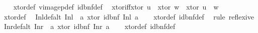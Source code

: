 \begin{isabellebody}
%
\isadelimproof
\ \ %
\endisadelimproof
%
\isatagproof
{}\isamarkupfalse%
\ xtor{\isacharunderscore}{\kern0pt}def\ vimage{}p{\isacharunderscore}{\kern0pt}def\ id{\isacharunderscore}{\kern0pt}bnf{\isacharunderscore}{\kern0pt}def\ \isacommand{{\isachardot}{\kern0pt}{\isachardot}{\kern0pt}}\isamarkupfalse%
%
\endisatagproof
{\isafoldproof}%
%
\isadelimproof
\isanewline
%
\endisadelimproof
\isanewline
{}\isamarkupfalse%
\ xtor{\isacharunderscore}{\kern0pt}iff{\isacharunderscore}{\kern0pt}xtor{\isacharcolon}{\kern0pt}\ {\isachardoublequoteopen}u\ {\isacharequal}{\kern0pt}\ xtor\ w\ {\isasymlongleftrightarrow}\ xtor\ u\ {\isacharequal}{\kern0pt}\ w{\isachardoublequoteclose}\isanewline
%
\isadelimproof
\ \ %
\endisadelimproof
%
\isatagproof
{}\isamarkupfalse%
\ xtor{\isacharunderscore}{\kern0pt}def\ \isacommand{{\isachardot}{\kern0pt}{\isachardot}{\kern0pt}}\isamarkupfalse%
%
\endisatagproof
{\isafoldproof}%
%
\isadelimproof
\isanewline
%
\endisadelimproof
\isanewline
{}\isamarkupfalse%
\ Inl{\isacharunderscore}{\kern0pt}def{\isacharunderscore}{\kern0pt}alt{\isacharcolon}{\kern0pt}\ {\isachardoublequoteopen}Inl\ {\isasymequiv}\ {\isacharparenleft}{\kern0pt}{\isasymlambda}a{\isachardot}{\kern0pt}\ xtor\ {\isacharparenleft}{\kern0pt}id{\isacharunderscore}{\kern0pt}bnf\ {\isacharparenleft}{\kern0pt}Inl\ a{\isacharparenright}{\kern0pt}{\isacharparenright}{\kern0pt}{\isacharparenright}{\kern0pt}{\isachardoublequoteclose}\isanewline
%
\isadelimproof
\ \ %
\endisadelimproof
%
\isatagproof
{}\isamarkupfalse%
\ xtor{\isacharunderscore}{\kern0pt}def\ id{\isacharunderscore}{\kern0pt}bnf{\isacharunderscore}{\kern0pt}def\ \isamarkupfalse%
\ {\isacharparenleft}{\kern0pt}rule\ reflexive{\isacharparenright}{\kern0pt}%
\endisatagproof
{\isafoldproof}%
%
\isadelimproof
\isanewline
%
\endisadelimproof
\isanewline
{}\isamarkupfalse%
\ Inr{\isacharunderscore}{\kern0pt}def{\isacharunderscore}{\kern0pt}alt{\isacharcolon}{\kern0pt}\ {\isachardoublequoteopen}Inr\ {\isasymequiv}\ {\isacharparenleft}{\kern0pt}{\isasymlambda}a{\isachardot}{\kern0pt}\ xtor\ {\isacharparenleft}{\kern0pt}id{\isacharunderscore}{\kern0pt}bnf\ {\isacharparenleft}{\kern0pt}Inr\ a{\isacharparenright}{\kern0pt}{\isacharparenright}{\kern0pt}{\isacharparenright}{\kern0pt}{\isachardoublequoteclose}\isanewline
%
\isadelimproof
\ \ %
\endisadelimproof
%
\isatagproof
{}\isamarkupfalse%
\ xtor{\isacharunderscore}{\kern0pt}def\ id{\isacharunderscore}{\kern0pt}bnf{\isacharunderscore}{\kern0pt}def\ \isamarkupfalse%

\end{isabellebody}
